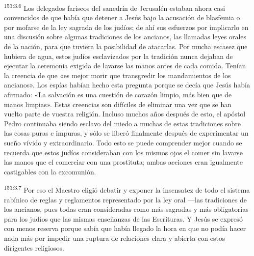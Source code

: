 \par 
\textsuperscript{153:3.6} Los delegados fariseos del sanedrín de Jerusalén estaban ahora casi convencidos de que había que detener a Jesús bajo la acusación de blasfemia o por mofarse de la ley sagrada de los judíos; de ahí sus esfuerzos por implicarlo en una discusión sobre algunas tradiciones de los ancianos, las llamadas leyes orales de la nación, para que tuviera la posibilidad de atacarlas. Por mucha escasez que hubiera de agua, estos judíos esclavizados por la tradición nunca dejaban de ejecutar la ceremonia exigida de lavarse las manos antes de cada comida. Tenían la creencia de que «es mejor morir que transgredir los mandamientos de los ancianos». Los espías habían hecho esta pregunta porque se decía que Jesús había afirmado: «La salvación es una cuestión de corazón limpio, más bien que de manos limpias». Estas creencias son difíciles de eliminar una vez que se han vuelto parte de vuestra religión. Incluso muchos años después de esto, el apóstol Pedro continuaba siendo esclavo del miedo a muchas de estas tradiciones sobre las cosas puras e impuras, y sólo se liberó finalmente después de experimentar un sueño vívido y extraordinario. Todo esto se puede comprender mejor cuando se recuerda que estos judíos consideraban con los mismos ojos el comer sin lavarse las manos que el comerciar con una prostituta; ambas acciones eran igualmente castigables con la excomunión.

\par 
\textsuperscript{153:3.7} Por eso el Maestro eligió debatir y exponer la insensatez de todo el sistema rabínico de reglas y reglamentos representado por la ley oral ---las tradiciones de los ancianos, pues todas eran consideradas como más sagradas y más obligatorias para los judíos que las mismas enseñanzas de las Escrituras. Y Jesús se expresó con menos reserva porque sabía que había llegado la hora en que no podía hacer nada más por impedir una ruptura de relaciones clara y abierta con estos dirigentes religiosos.


